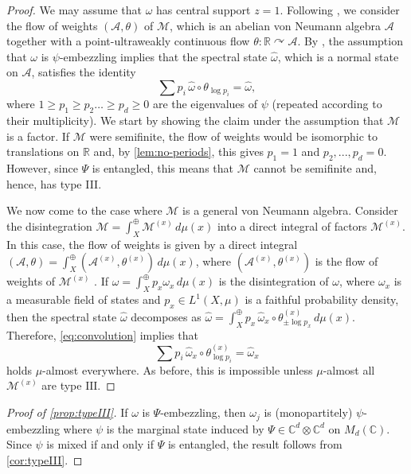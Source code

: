 \documentclass[a4paper, 10pt, onecolumn, accepted=2025-07-22]{quantumarticle}
\theoremstyle{definition}
\newcommand{\ox}{\otimes}
\newcommand{\mc}{\mathcal}
\newcommand{\III}{{\mathrm{III}}}
\newcommand{\up}[1]{^{(#1)}}
\renewcommand{\hat}{\widehat}
\def\A{{\mc A}}
\def\CC{{\mathbb C}}
\def\M{{\mc M}}
\def\RR{{\mathbb R}}
\newcommand*{\1}{\text{\usefont{U}{bbold}{m}{n}1}}
\begin{document}
\begin{proof}
    We may assume that $\omega$ has central support $z=1$.
    Following \cite{long_paper}, we consider the flow of weights $(\A,\theta)$ of $\M$, which is an abelian von Neumann algebra $\A$ together with a point-ultraweakly continuous flow $\theta :\RR\curvearrowright\A$.
    By \cite[Cor.~47]{long_paper}, the assumption that $\omega$ is $\psi$-embezzling implies that the spectral state $\hat \omega$, which is a normal state on $\A$, satisfies the identity
    \begin{equation}\label{eq:convolution}
        \sum p_i \,\hat\omega\circ\theta_{\log p_i} = \hat\omega,
    \end{equation}
    where $1\ge p_1\ge p_2\ldots \ge p_d\ge 0$ are the eigenvalues of $\psi$ (repeated according to their multiplicity).
    We start by showing the claim under the assumption that $\M$ is a factor.
    If $\M$ were semifinite, the flow of weights would be isomorphic to translations on $\RR$ and, by \cref{lem:no-periods}, this gives $p_1=1$ and $p_2,..., p_d =0$. However, since $\Psi$ is entangled, this means that $\M$ cannot be semifinite and, hence, has type III.

    We now come to the case where $\M$ is a general von Neumann algebra. 
    Consider the disintegration $\M=\int_X^\oplus \M\up x\,d\mu(x)$ into a direct integral of factors $\M\up x$. 
    In this case, the flow of weights is given by a direct integral $(\A,\theta)=\int^\oplus_X (\A\up x, \theta\up x)\,d\mu(x)$, where $(\A\up x,\theta\up x)$ is the flow of weights of $\M\up x$ \cite[Prop.~8.1]{haagerup1990equivalence}.
    If $\omega = \int^\oplus_X p_x\omega_x \,d\mu(x)$ is the disintegration of $\omega$, where $\omega_x$ is a measurable field of states and $p_x\in L^1(X,\mu)$ is a faithful probability density, then the spectral state $\hat \omega$ decomposes as $\hat \omega = \int^\oplus_X p_x \,\hat\omega_x\circ \theta_{\pm \log p_x}\up x \,d\mu(x)$.
    Therefore, \eqref{eq:convolution} implies that
    \begin{equation}
        \sum p_i\, \hat\omega_x \circ\theta_{\log p_i}\up x = \hat\omega_x
    \end{equation}
    holds $\mu$-almost everywhere.
    As before, this is impossible unless $\mu$-almost all $\M\up x$ are type $\III$.
\end{proof}
\begin{proof}[Proof of \cref{prop:typeIII}]
    If $\omega$ is $\Psi$-embezzling, then $\omega_j$ is (monopartitely) $\psi$-embezzling where $\psi$ is the marginal state induced by $\Psi\in \CC^d\ox \CC^d$ on $M_d(\CC)$.
    Since $\psi$ is mixed if and only if $\Psi$ is entangled, the result follows from \cref{cor:typeIII}.
\end{proof}
\end{document}
